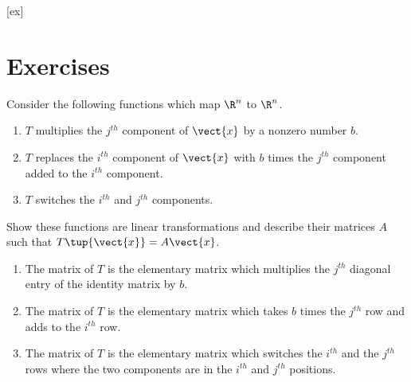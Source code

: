 [ex]
\section*{Exercises}

\begin{enumialphparenastyle}

\begin{ex} \label{exerlineartransf}
Consider the following functions which map $\R^{n}$ to $\R^{n}$. 

\begin{enumerate}
\item $T$ multiplies the $j^{th}$ component of $\vect{x}$ by a nonzero
number $b.$

\item $T$ replaces the $i^{th}$ component of $\vect{x}$ with $b$ times the
$j^{th}$ component added to the $i^{th}$ component.

\item $T$ switches the $i^{th}$ and $j^{th}$ components.
\end{enumerate}

Show these functions are linear transformations and describe their matrices $A$ such that $T\tup{\vect{x}} = A\vect{x}$.
\begin{sol}
\begin{enumerate}
\item The matrix of $T$ is the elementary matrix which multiplies
the $j^{th}$ diagonal entry of the identity matrix by $b$.
\item The matrix of $T$ is the
elementary matrix which takes $b$ times the $j^{th}$ row and adds to the $%
i^{th}$ row.
\item The matrix of $T$ is the elementary matrix which switches the $%
i^{th}$ and the $j^{th}$ rows where the two components are in the $i^{th}$
and $j^{th}$ positions.
\end{enumerate}
\end{sol}
\end{ex}


\end{enumialphparenastyle}
